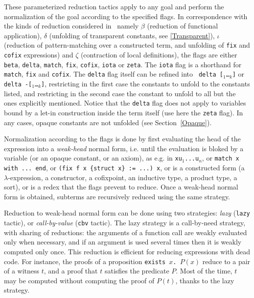 \begin{coq_example*}
These parameterized reduction tactics apply to any goal and perform
the normalization of the goal according to the specified flags. In
correspondence with the kinds of reduction considered in \Coq\, namely
$\beta$ (reduction of functional application), $\delta$ (unfolding of
transparent constants, see \ref{Transparent}), $\iota$ (reduction of
pattern-matching over a constructed term, and unfolding of {\tt fix}
and {\tt cofix} expressions) and $\zeta$ (contraction of local
definitions), the flags are either {\tt beta}, {\tt delta},
{\tt match}, {\tt fix}, {\tt cofix}, {\tt iota} or {\tt zeta}.
The {\tt iota} flag is a shorthand for {\tt match}, {\tt fix} and {\tt cofix}.
The {\tt delta} flag itself can be refined into {\tt
delta [\qualid$_1$\ldots\qualid$_k$]} or {\tt delta
-[\qualid$_1$\ldots\qualid$_k$]}, restricting in the first case the
constants to unfold to the constants listed, and restricting in the
second case the constant to unfold to all but the ones explicitly
mentioned. Notice that the {\tt delta} flag does not apply to
variables bound by a let-in construction inside the term itself (use
here the {\tt zeta} flag). In any cases, opaque constants are not
unfolded (see Section~\ref{Opaque}).

Normalization according to the flags is done by first evaluating the
head of the expression into a {\em weak-head} normal form, i.e. until
the evaluation is bloked by a variable (or an opaque constant, or an
axiom), as e.g. in {\tt x\;u$_1$\;...\;u$_n$}, or {\tt match x with
  ... end}, or {\tt (fix f x \{struct x\} := ...) x}, or is a
constructed form (a $\lambda$-expression, a constructor, a cofixpoint,
an inductive type, a product type, a sort), or is a redex that the
flags prevent to reduce. Once a weak-head normal form is obtained,
subterms are recursively reduced using the same strategy.

Reduction to weak-head normal form can be done using two strategies:
{\em lazy} ({\tt lazy} tactic), or {\em call-by-value} ({\tt cbv}
tactic). The lazy strategy is a call-by-need strategy, with sharing of
reductions: the arguments of a function call are weakly evaluated only
when necessary, and if an argument is used several times then it is
weakly computed only once. This reduction is efficient for reducing
expressions with dead code. For instance, the proofs of a proposition
{\tt exists~$x$. $P(x)$} reduce to a pair of a witness $t$, and a
proof that $t$ satisfies the predicate $P$. Most of the time, $t$ may
be computed without computing the proof of $P(t)$, thanks to the lazy
strategy.


\end{coq_example*}
